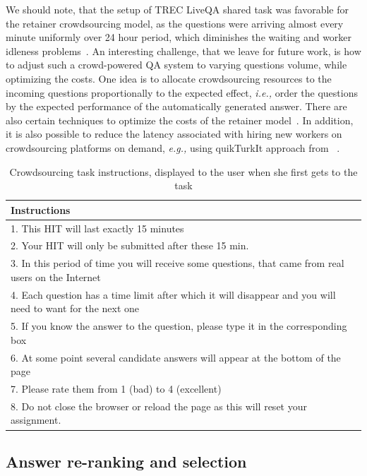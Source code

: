 \documentclass[letterpaper]{article}
\makeatletter
\newcommand{\eg}{\textit{e.g.,}\@\xspace}
\newcommand{\ie}{\textit{i.e.,}\@\xspace}
\makeatother
\begin{document}
We should note, that the setup of TREC LiveQA shared task was favorable for the retainer crowdsourcing model, as the questions were arriving almost every minute uniformly over 24 hour period, which diminishes the waiting and worker idleness problems~\cite{Lasecki:2013:CCC:2501988.2502057}.
An interesting challenge, that we leave for future work, is how to adjust such a crowd-powered QA system to varying questions volume, while optimizing the costs.
One idea is to allocate crowdsourcing resources to the incoming questions proportionally to the expected effect, \ie order the questions by the expected performance of the automatically generated answer.
There are also certain techniques to optimize the costs of the retainer model~\cite{bernstein2012analytic}.
In addition, it is also possible to reduce the latency associated with hiring new workers on crowdsourcing platforms on demand, \eg using quikTurkIt approach from ~\cite{bigham2010vizwiz}.

\begin{table}[ht]
\centering
\begin{tabular}{| p{7.8cm} |}
\hline
\textbf{Instructions} \\
\hline
1. This HIT will last exactly 15 minutes\\
2. Your HIT will only be submitted after these 15 min.\\
3. In this period of time you will receive some questions, that came from real users on the Internet\\
4. Each question has a time limit after which it will disappear and you will need to want for the next one\\
5. If you know the answer to the question, please type it in the corresponding box\\
6. At some point several candidate answers will appear at the bottom of the page\\
7. Please rate them from 1 (bad) to 4 (excellent)\\
8. Do not close the browser or reload the page as this will reset your assignment.\\
\hline
\end{tabular}
\caption{Crowdsourcing task instructions, displayed to the user when she first gets to the task}
\label{table:crowd_instructions}
\end{table}

\subsection{Answer re-ranking and selection}
\label{sec:system:reranking}
\end{document}
